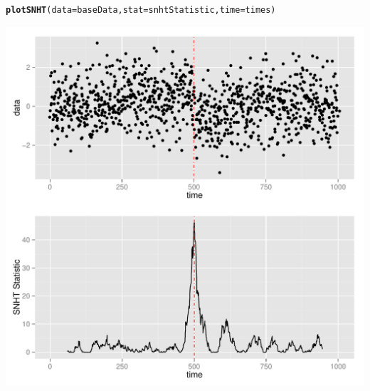 \documentclass[nojss]{jss}\usepackage[]{graphicx}\usepackage[]{color}
\makeatletter
\def\maxwidth{ %
  \ifdim\Gin@nat@width>\linewidth
    \linewidth
  \else
    \Gin@nat@width
  \fi
}
\newcommand{\hlstd}[1]{\textcolor[rgb]{0.345,0.345,0.345}{#1}}%
\newcommand{\hlkwc}[1]{\textcolor[rgb]{0.333,0.667,0.333}{#1}}%
\newcommand{\hlkwd}[1]{\textcolor[rgb]{0.737,0.353,0.396}{\textbf{#1}}}%
\newenvironment{kframe}{%
 \def\at@end@of@kframe{}%
 \ifinner\ifhmode%
  \def\at@end@of@kframe{\end{minipage}}%
  \begin{minipage}{\columnwidth}%
 \fi\fi%
 \def\FrameCommand##1{\hskip\@totalleftmargin \hskip-\fboxsep
 \colorbox{shadecolor}{##1}\hskip-\fboxsep
     \hskip-\linewidth \hskip-\@totalleftmargin \hskip\columnwidth}%
 \MakeFramed {\advance\hsize-\width
   \@totalleftmargin\z@ \linewidth\hsize
   \@setminipage}}%
 {\par\unskip\endMakeFramed%
 \at@end@of@kframe}
\newenvironment{knitrout}{}{} %
\makeatother
\begin{document}
\begin{knitrout}
\color{fgcolor}\begin{kframe}
\begin{alltt}
\hlkwd{plotSNHT}\hlstd{(}\hlkwc{data} \hlstd{= baseData,} \hlkwc{stat} \hlstd{= snhtStatistic,} \hlkwc{time} \hlstd{= times)}
\end{alltt}
\end{kframe}

{\centering \includegraphics[width=\maxwidth]{figure/unnamed-chunk-11-1} 

}



\end{knitrout}


\end{document}
